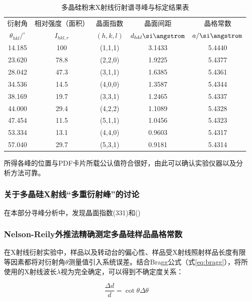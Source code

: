 \documentclass{thuemp}
\begin{document}
\begin{table}[H]
    \centering
    \captionnamefont{\wuhao\bf\heiti}
    \captiontitlefont{\wuhao\bf\heiti}
    \caption{多晶硅粉末X射线衍射谱寻峰与标定结果表}
    \label{tab:si_xrd_indexed}
    \liuhao
    \begin{tabular}{ccccc}
        \toprule
        衍射角 & 相对强度（面积）& 晶面指数 & 晶面间距 & 晶格常数 \\
        $\theta_{hkl}/^\circ$ & $I_{hkl,r}$ & $(h,k,l)$ & $d_{hkl}\text{\si\angstrom}$ & $a/\text{\si\angstrom}$ \\
        \midrule
        14.185 &  100 & (1,1,1) & 3.1433 & 5.4440 \\
        23.620 & 78.8 & (2,2,0) & 1.9225 & 5.4377 \\
        28.042 & 47.3 & (3,1,1) & 1.6385 & 5.4361 \\
        34.536 & 14.5 & (4,0,0) & 1.3587 & 5.4344 \\
        38.169 & 19.7 & (3,3,1) & 1.2465 & 5.4337 \\
        44.000 & 29.4 & (4,2,2) & 1.1089 & 5.4328 \\
        47.454 & 11.5 & (5,1,1) & 1.0456 & 5.4323 \\
        53.334 & 13.1 & (4,4,0) & 0.9603 & 5.4317 \\
        57.040 & 29.7 & (5,3,1) & 0.9181 & 5.4314 \\
        \bottomrule
    \end{tabular}
\end{table}

所得各峰的位置与PDF卡片所载公认值符合很好，由此可以确认实验仪器以及分析方法可靠。

\subsubsection{关于多晶硅X射线“多重衍射峰”的讨论}

在本部分寻峰分析中，发现晶面指数(331)和()

\subsubsection{Nelson-Reily外推法精确测定多晶硅样品晶格常数}

在X射线衍射实验中，样品以及转动台的偏心性、样品受X射线照射样品长度有限等因素都将对衍射角$\theta$测量值引入系统误差。结合Bragg公式（式\ref{eq:bragg}），将所使用的X射线波长$\lambda$视为完全确定，可以得到不确定度关系：

\begin{equation}
    \frac{\Delta d}{d} = \cot{\theta}\Delta\theta 
    \label{eqn:d_err}
\end{equation}
\end{document}

